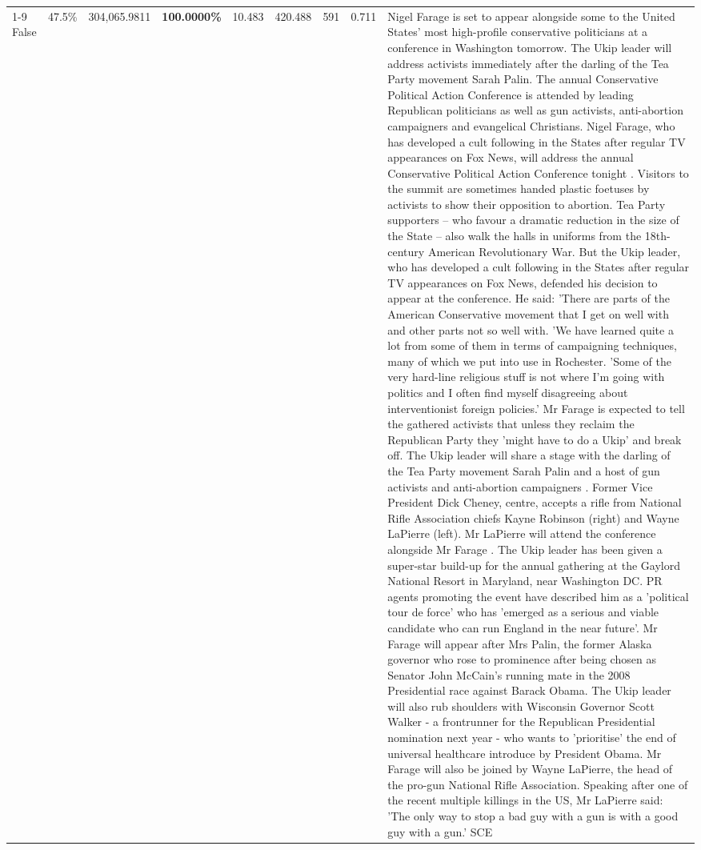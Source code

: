 \begin{table}[H]
\begin{tabular}{lllrlllll}
\cline{1-9}
False & 47.5\% & 304,065.9811 & \bfseries \color{red} 100.0000\% & 10.483 & 420.488 & 591 & 0.711 & Nigel Farage is set to appear alongside some to the United States' most high-profile conservative politicians at a conference in Washington tomorrow. The Ukip leader will address activists immediately after the darling of the Tea Party movement Sarah Palin. The annual Conservative Political Action Conference is attended by leading Republican politicians as well as gun activists, anti-abortion campaigners and evangelical Christians. Nigel Farage, who has developed a cult following in the States after regular TV appearances on Fox News, will address the annual Conservative Political Action Conference tonight . Visitors to the summit are sometimes handed plastic foetuses by activists to show their opposition to abortion. Tea Party supporters – who favour a dramatic reduction in the size of the State – also walk the halls in uniforms from the 18th-century American Revolutionary War. But the Ukip leader, who has developed a cult following in the States after regular TV appearances on Fox News, defended his decision to appear at the conference. He said: 'There are parts of the American Conservative movement that I get on well with and other parts not so well with. 'We have learned quite a lot from some of them in terms of campaigning techniques, many of which we put into use in Rochester. 'Some of the very hard-line religious stuff is not where I'm going with politics and I often find myself disagreeing about interventionist foreign policies.' Mr Farage is expected to tell the gathered activists that unless they reclaim the Republican Party they 'might have to do a Ukip' and break off. The Ukip leader will share a stage with the darling of the Tea Party movement Sarah Palin and a host of gun activists and anti-abortion campaigners . Former Vice President Dick Cheney, centre, accepts a rifle from National Rifle Association chiefs Kayne Robinson (right) and Wayne LaPierre (left). Mr LaPierre will attend the conference alongside Mr Farage . The Ukip leader has been given a super-star build-up for the annual gathering at the Gaylord National Resort in Maryland, near Washington DC. PR agents promoting the event have described him as a 'political tour de force' who has 'emerged as a serious and viable candidate who can run England in the near future'. Mr Farage will appear after Mrs Palin, the former Alaska governor who rose to prominence after being chosen as Senator John McCain's running mate in the 2008 Presidential race against Barack Obama. The Ukip leader will also rub shoulders with Wisconsin Governor Scott Walker - a frontrunner for the Republican Presidential nomination next year - who wants to 'prioritise' the end of universal healthcare introduce by President Obama. Mr Farage will also be joined by Wayne LaPierre, the head of the pro-gun National Rifle Association. Speaking after one of the recent multiple killings in the US, Mr LaPierre said: 'The only way to stop a bad guy with a gun is with a good guy with a gun.' SCE \\

\end{tabular}
\end{table}

